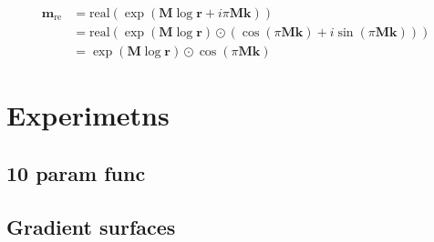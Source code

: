 \documentclass[9pt]{article}
\newcommand{\real}{\text{real}}
\begin{document}
\begin{align}
  \bm m_{\text{re}} &= \real(\exp(\bm M \log \bm r + i\pi\bm M\bm k)) \\
    &= \real(\exp(\bm M \log \bm r) \odot (\cos(\pi \bm M \bm k) + i \sin(\pi \bm M \bm k))) \\
    &= \exp(\bm M \log \bm r) \odot \cos(\pi \bm M \bm k)
\end{align}

\section{Experimetns}%
\label{sec:experimetns}

\subsection{10 param func}%
\label{sub:10_param_func}


% 
% 


\subsection{Gradient surfaces}%
\label{sub:gradient_surfaces}





\end{document}
